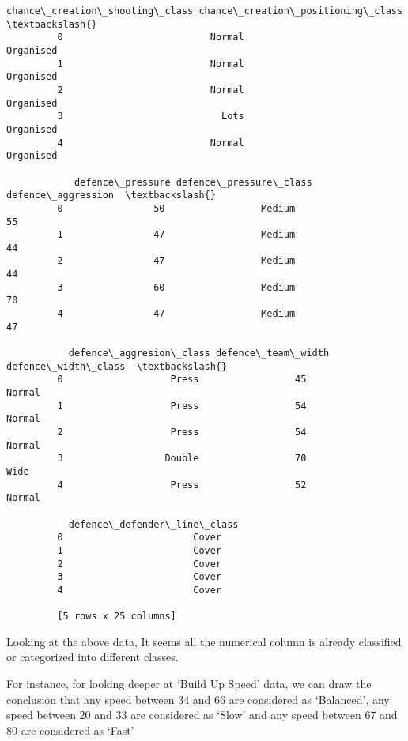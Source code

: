 \documentclass[11pt]{article}
\begin{document}
\begin{Verbatim}[commandchars=\\\{\}]
            chance\_creation\_shooting\_class chance\_creation\_positioning\_class  \textbackslash{}
         0                          Normal                         Organised   
         1                          Normal                         Organised   
         2                          Normal                         Organised   
         3                            Lots                         Organised   
         4                          Normal                         Organised   
         
            defence\_pressure defence\_pressure\_class  defence\_aggression  \textbackslash{}
         0                50                 Medium                  55   
         1                47                 Medium                  44   
         2                47                 Medium                  44   
         3                60                 Medium                  70   
         4                47                 Medium                  47   
         
           defence\_aggresion\_class defence\_team\_width  defence\_width\_class  \textbackslash{}
         0                   Press                 45               Normal   
         1                   Press                 54               Normal   
         2                   Press                 54               Normal   
         3                  Double                 70                 Wide   
         4                   Press                 52               Normal   
         
           defence\_defender\_line\_class  
         0                       Cover  
         1                       Cover  
         2                       Cover  
         3                       Cover  
         4                       Cover  
         
         [5 rows x 25 columns]
\end{Verbatim}
            
    Looking at the above data, It seems all the numerical column is already
classified or categorized into different classes.

For instance, for looking deeper at `Build Up Speed' data, we can draw
the conclusion that any speed between 34 and 66 are considered as
`Balanced', any speed between 20 and 33 are considered as `Slow' and any
speed between 67 and 80 are considered as `Fast'
\end{document}
